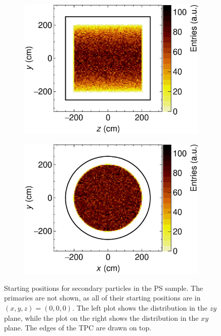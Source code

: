 \begin{figure}[!ht]
     \centering
     \begin{subfigure}[b]{0.48\textwidth}
         \centering
         \includegraphics[width=\textwidth]{figures/ch5-KF_NDGAr/ToySample/testTPCMirrorYZ_view.eps}
         \caption{}
         \label{fig:YZViewGAr}
     \end{subfigure}
     \begin{subfigure}[b]{0.48\textwidth}
         \centering
         \includegraphics[width=\textwidth]{figures/ch5-KF_NDGAr/ToySample/testTPCMirrorXY_view.eps}
         \caption{}
         \label{fig:XYViewGAr}
     \end{subfigure}
        \caption[Starting positions for secondary particles in the PS sample.]{Starting positions for secondary particles in the PS sample. The primaries are not shown, as all of their starting positions are in $(x,y,z)=(0,0,0)$. The left plot shows the distribution in the $zy$ plane, while the plot on the right shows the distribution in the $xy$ plane. The edges of the TPC are drawn on top. } \label{fig:ViewGAr}
\end{figure}

